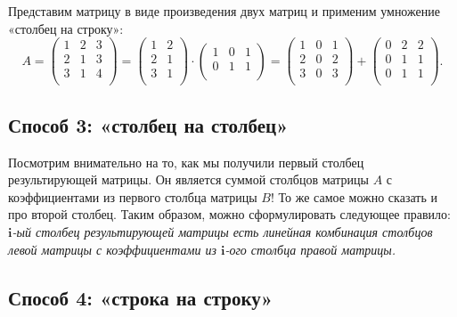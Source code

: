 \documentclass[11pt,a4paper]{article}
\begin{document}
Представим матрицу в виде произведения двух матриц и применим умножение
«столбец на строку»: \[
  A =
  \begin{pmatrix}
     1 & 2 & 3 \\
     2 & 1 & 3 \\
     3 & 1 & 4 \\
  \end{pmatrix}
  =
  \begin{pmatrix}
     1 & 2 \\
     2 & 1 \\
     3 & 1 \\
  \end{pmatrix}
  \cdot
  \begin{pmatrix}
     1 & 0 & 1 \\
     0 & 1 & 1 \\
  \end{pmatrix}
  =
  \begin{pmatrix}
     1 & 0 & 1 \\
     2 & 0 & 2 \\
     3 & 0 & 3 \\
  \end{pmatrix}
  +
  \begin{pmatrix}
     0 & 2 & 2 \\
     0 & 1 & 1 \\
     0 & 1 & 1 \\
  \end{pmatrix}.
\]

    \hypertarget{ux441ux43fux43eux441ux43eux431-3-ux441ux442ux43eux43bux431ux435ux446-ux43dux430-ux441ux442ux43eux43bux431ux435ux446}{%
\subsection{Способ 3: «столбец на
столбец»}\label{ux441ux43fux43eux441ux43eux431-3-ux441ux442ux43eux43bux431ux435ux446-ux43dux430-ux441ux442ux43eux43bux431ux435ux446}}

Посмотрим внимательно на то, как мы получили первый столбец
результирующей матрицы. Он является суммой столбцов матрицы \(A\) с
коэффициентами из первого столбца матрицы \(B\)! То же самое можно
сказать и про второй столбец. Таким образом, можно сформулировать
следующее правило:\\
\emph{\(\mathbf{i}\)-ый столбец результирующей матрицы есть линейная
комбинация столбцов левой матрицы с коэффициентами из \(\mathbf{i}\)-ого
столбца правой матрицы.}

    \hypertarget{ux441ux43fux43eux441ux43eux431-4-ux441ux442ux440ux43eux43aux430-ux43dux430-ux441ux442ux440ux43eux43aux443}{%
\subsection{Способ 4: «строка на
строку»}\label{ux441ux43fux43eux441ux43eux431-4-ux441ux442ux440ux43eux43aux430-ux43dux430-ux441ux442ux440ux43eux43aux443}}
\end{document}
